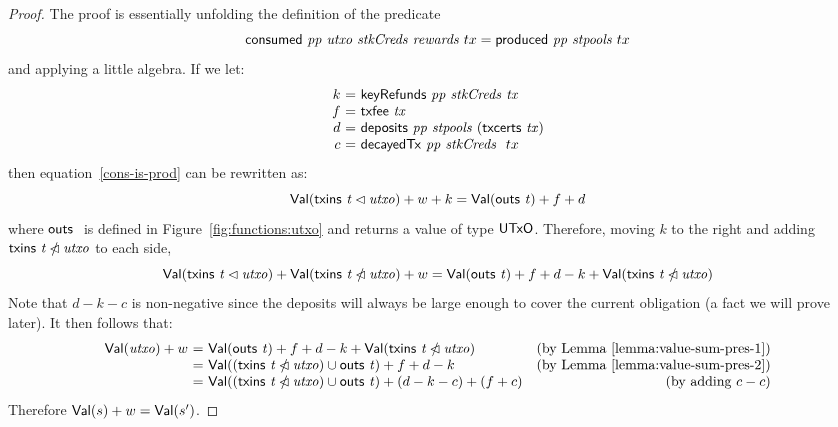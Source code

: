 \begin{proof}
  The proof is essentially unfolding the definition of the predicate
  \begin{equation}
    \label{cons-is-prod}
    \mathsf{consumed}~ \mathit{pp}~ \mathit{utxo}~ \mathit{stkCreds}~ \mathit{rewards}~{tx} = \mathsf{produced}~ \mathit{pp}~ \mathit{stpools}~{tx}
  \end{equation}
  and applying a little algebra.
%
If we let:
  \begin{equation*}
    \begin{array}{r@{~=~}l}
      k & \keyRefunds{pp}{stkCreds}{tx} \\
      f & \txfee{tx} \\
      d & \deposits{pp}{stpools}~{(\txcerts{tx})} \\
      c & \decayedTx{pp}{stkCreds}~{tx} \\
    \end{array}
  \end{equation*}
  then equation~\ref{cons-is-prod} can be rewritten as:
  \begin{equation*}
    \mathsf{Val}(\mathsf{txins}~ \mathit{t} \lhd{\ensuremath{\mathit{utxo}}}) + w + k = \mathsf{Val}(\mathsf{outs}~ \mathit{t}) + f + d
  \end{equation*}
  where $\mathsf{outs}~ \mathit{}$ is defined in Figure~\ref{fig:functions:utxo} and returns a value of type $\mathsf{UTxO}$.
  Therefore, moving $k$ to the right and adding $\mathsf{txins}~ \mathit{t} \mathbin{\slashed{\lhd}}{\mathit{utxo}}$ to each side,
  \begin{equation*}
    \mathsf{Val}(\mathsf{txins}~ \mathit{t} \lhd{\ensuremath{\mathit{utxo}}}) + \mathsf{Val}(\mathsf{txins}~ \mathit{t} \mathbin{\slashed{\lhd}}{\mathit{utxo}}) + w
    = \mathsf{Val}(\mathsf{outs}~ \mathit{t}) + f + d - k + \mathsf{Val}(\mathsf{txins}~ \mathit{t} \mathbin{\slashed{\lhd}}{\mathit{utxo}})
  \end{equation*}
  Note that $d-k-c$ is non-negative since the deposits will always be large enough to cover
  the current obligation (a fact we will prove later).
%
  It then follows that:
  \begin{equation*}
    \begin{array}{r@{~=~}lr}
      \Val(\var{utxo}) + w
    & \Val(\outs{t}) + f + d - k + \Val(\txins{t} \subtractdom{\var{utxo}})
    & \text{(by Lemma~\ref{lemma:value-sum-pres-1})}
    \\
    & \Val((\txins{t} \subtractdom{\var{utxo}})\cup\outs{t}) + f + d - k
    & \text{(by Lemma~\ref{lemma:value-sum-pres-2})}
    \\
    & \Val((\txins{t} \subtractdom{\var{utxo}})\cup\outs{t}) + (d-k-c) + (f+c)
    & \text{(by adding $c-c$)}
    \end{array}
  \end{equation*}
  Therefore $\mathsf{Val}(s) + w = \mathsf{Val}(s')$.
\end{proof}


